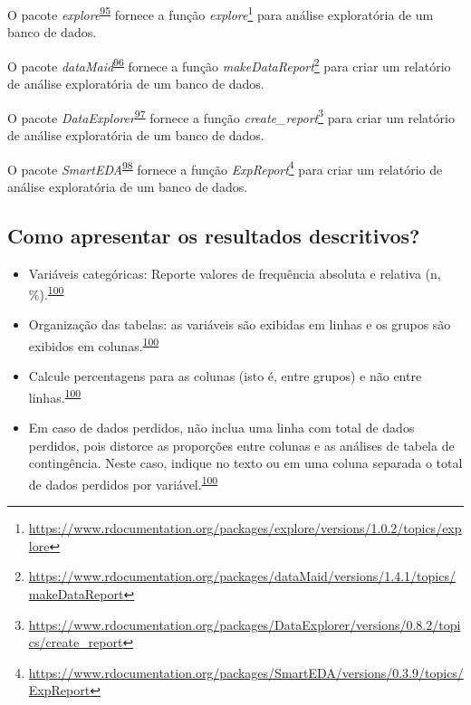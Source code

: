 \documentclass[
  a4paper,
]{book}
\renewcommand{\href}[2]{#2\footnote{\url{#1}}}
\newenvironment{infobox}[1]
  {
  \begin{itemize}
  \renewcommand{\labelitemi}{
    \raisebox{-.7\height}[0pt][0pt]{
      {\setkeys{Gin}{width=3em,keepaspectratio}
        \texttt{[image: \#1]}}
    }
  }
  \setlength{\fboxsep}{1em}
  \begin{blackbox}
  \item
  }
  {
  \end{blackbox}
  \end{itemize}
  }
\begin{document}
\begin{infobox}{images/Rlogo}
O pacote \emph{explore}\textsuperscript{\protect\hyperlink{ref-explore}{95}} fornece a função \href{https://www.rdocumentation.org/packages/explore/versions/1.0.2/topics/explore}{\emph{explore}} para análise exploratória de um banco de dados.

\end{infobox}

\begin{infobox}{images/Rlogo}
O pacote \emph{dataMaid}\textsuperscript{\protect\hyperlink{ref-dataMaid}{96}} fornece a função \href{https://www.rdocumentation.org/packages/dataMaid/versions/1.4.1/topics/makeDataReport}{\emph{makeDataReport}} para criar um relatório de análise exploratória de um banco de dados.

\end{infobox}

\begin{infobox}{images/Rlogo}
O pacote \emph{DataExplorer}\textsuperscript{\protect\hyperlink{ref-DataExplorer-2}{97}} fornece a função \href{https://www.rdocumentation.org/packages/DataExplorer/versions/0.8.2/topics/create_report}{\emph{create\_report}} para criar um relatório de análise exploratória de um banco de dados.

\end{infobox}

\begin{infobox}{images/Rlogo}
O pacote \emph{SmartEDA}\textsuperscript{\protect\hyperlink{ref-SmartEDA}{98}} fornece a função \href{https://www.rdocumentation.org/packages/SmartEDA/versions/0.3.9/topics/ExpReport}{\emph{ExpReport}} para criar um relatório de análise exploratória de um banco de dados.

\end{infobox}

\hypertarget{como-apresentar-os-resultados-descritivos}{%
\subsection{Como apresentar os resultados descritivos?}\label{como-apresentar-os-resultados-descritivos}}

\begin{itemize}
\item
  Variáveis categóricas: Reporte valores de frequência absoluta e relativa (n, \%).\textsuperscript{\protect\hyperlink{ref-Cummings2003}{100}}
\item
  Organização das tabelas: as variáveis são exibidas em linhas e os grupos são exibidos em colunas.\textsuperscript{\protect\hyperlink{ref-Cummings2003}{100}}
\item
  Calcule percentagens para as colunas (isto é, entre grupos) e não entre linhas.\textsuperscript{\protect\hyperlink{ref-Cummings2003}{100}}
\item
  Em caso de dados perdidos, não inclua uma linha com total de dados perdidos, pois distorce as proporções entre colunas e as análises de tabela de contingência. Neste caso, indique no texto ou em uma coluna separada o total de dados perdidos por variável.\textsuperscript{\protect\hyperlink{ref-Cummings2003}{100}}
\end{itemize}
\end{document}

